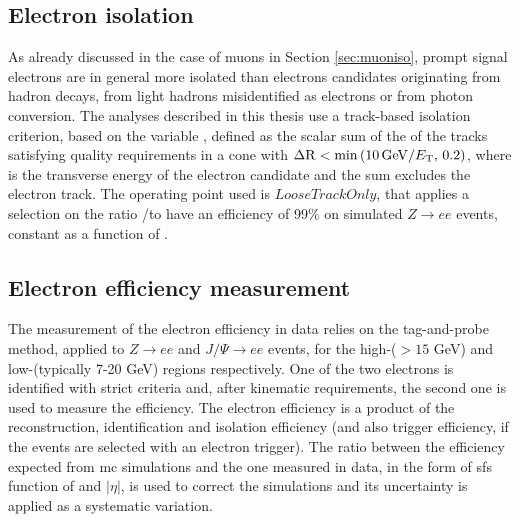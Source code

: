 \subsection{Electron isolation}

As already discussed in the case of muons in Section \ref{sec:muoniso}, prompt signal electrons are in general more isolated than 
electrons candidates originating from hadron decays, from light hadrons misidentified as electrons or from photon conversion. 
The analyses described in this thesis use a track-based isolation criterion, based on the variable \ptvarele, defined as the scalar sum of the \pt 
of the tracks satisfying quality requirements in a cone with $\Delta\mathrm{R} < \min \left(  10 \, \mathrm{GeV}/E_{\rm T} , \, 0.2\right)$, where \et is the transverse energy of the electron candidate and the sum excludes the electron track. The operating point used is $LooseTrackOnly$, 
that applies a selection on the ratio \ptvarele/\et to have an efficiency of 99\% on simulated $Z\rightarrow e e$ events, constant as a function of \et.

\subsection{Electron efficiency measurement}

The measurement of the electron efficiency in data relies on the tag-and-probe method, applied to $Z\rightarrow e e$ and $J/\Psi \rightarrow e e$ events, for the high-\et ($> 15$ GeV) and low-\et (typically 7-20 GeV) regions respectively. One of the two electrons is identified with strict criteria and, after kinematic requirements, the second one is used to measure the efficiency.
The electron efficiency is a product of the reconstruction, identification and isolation efficiency 
(and also trigger efficiency, if the events are selected with an electron trigger).  The ratio between the efficiency expected from \gls{mc} simulations and the one measured in data, in the form of \glspl{sf} function of \et and $|\eta|$, is used to correct the simulations and its uncertainty is applied as a systematic variation. 

